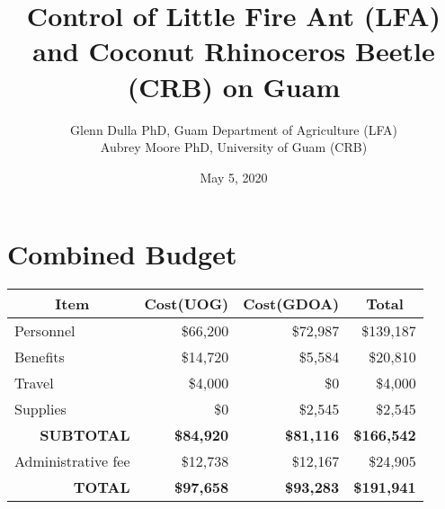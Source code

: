 \documentclass[12pt,letterpaper,english,bibliography=totocnumbered, abstract=on]{scrartcl}
\begin{document}
\titlehead{Grant Proposal: USDA Forest Service FY2020}

\title{Control of Little Fire Ant (LFA) and Coconut Rhinoceros Beetle (CRB) on Guam}

\author{Glenn Dulla PhD, Guam Department of Agriculture (LFA)\\
	Aubrey Moore PhD, University of Guam (CRB)}

\date{May 5, 2020}

\maketitle
\newpage
\tableofcontents

\pagebreak

\section{Combined Budget}

\begin{table}[h]
	\centering
	\begin{tabular}{@{}lrrr@{}}
		\toprule
		\multicolumn{1}{c}{\textbf{Item}} & \multicolumn{1}{c}{\textbf{Cost(UOG)}} & \multicolumn{1}{c}{\textbf{Cost(GDOA)}} & \multicolumn{1}{c}{\textbf{Total}} \\ 
		\midrule
		Personnel & \$66,200 & \$72,987 & \$139,187 \\
		Benefits & \$14,720 & \$5,584 & \$20,810 \\
		Travel & \$4,000 & \$0 & \$4,000 \\
		Supplies & \$0 & \$2,545 & \$2,545 \\ 
		\midrule
		\multicolumn{1}{r}{\textbf{SUBTOTAL}} & \textbf{\$84,920} & \textbf{\$81,116} & \textbf{\$166,542} \\ \midrule
		Administrative fee & \$12,738 & \$12,167 & \$24,905 \\ \midrule
		\multicolumn{1}{r}{\textbf{TOTAL}} & \textbf{\$97,658} & \textbf{\$93,283} & \textbf{\$191,941} \\ \bottomrule
	\end{tabular}
\end{table}
\end{document}
